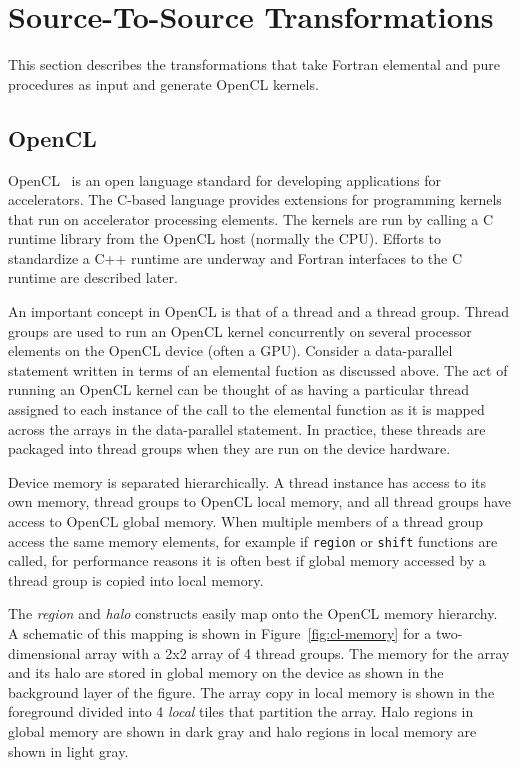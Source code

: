 \section{Source-To-Source Transformations}

This section describes the transformations that take Fortran elemental and
pure procedures as input and generate OpenCL kernels.

\subsection{OpenCL}

OpenCL~\cite{opencl:standard} is an open language standard for developing
applications for accelerators.  The C-based language provides extensions for
programming kernels that run on accelerator processing elements.  The kernels
are run by calling a C runtime library from the OpenCL host (normally the
CPU).  Efforts to standardize a C++ runtime are underway and Fortran
interfaces to the C runtime are described later.

An important concept in OpenCL is that of a thread and a thread group.  Thread
groups are used to run an OpenCL kernel concurrently on several processor
elements on the OpenCL device (often a GPU).  Consider a data-parallel
statement written in terms of an elemental fuction as discussed above.  The
act of running an OpenCL kernel can be thought of as having a particular
thread assigned to each instance of the call to the elemental function as it
is mapped across the arrays in the data-parallel statement.  In practice,
these threads are packaged into thread groups when they are run on the device
hardware.

Device memory is separated hierarchically.  A thread instance has access to
its own memory, thread groups to OpenCL local memory, and all thread groups
have access to OpenCL global memory.  When multiple members of a thread group
access the same memory elements, for example if {\tt region} or {\tt shift}
functions are called, for performance reasons it is often best if global
memory accessed by a thread group is copied into local memory.

The \emph{region} and \emph{halo} constructs easily map onto the OpenCL memory
hierarchy.  A schematic of this mapping is shown in Figure~\ref{fig:cl-memory}
for a two-dimensional array with a 2x2 array of 4 thread groups.  The memory
for the array and its halo are stored in global memory on the device as shown
in the background layer of the figure.  The array copy in local memory is
shown in the foreground divided into 4 \emph{local} tiles that partition the
array.  Halo regions in global memory are shown in dark gray and halo regions
in local memory are shown in light gray.


